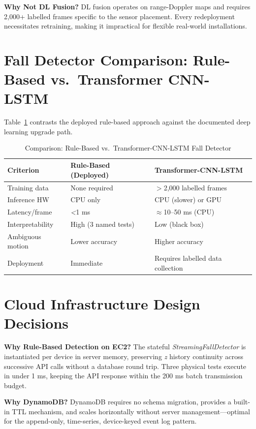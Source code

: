 \textbf{Why Not DL Fusion?} DL fusion operates on range-Doppler maps and requires 2,000+ labelled frames specific to the sensor placement. Every redeployment necessitates retraining, making it impractical for flexible real-world installations.

\section[Fall Detector Comparison]{Fall Detector Comparison: Rule-Based vs.~Transformer CNN-LSTM}

Table~\ref{tab:summary_8} contrasts the deployed rule-based approach against the documented deep learning upgrade path.

\begin{table}[H]
\caption{Comparison: Rule-Based vs.\ Transformer-CNN-LSTM Fall Detector}
\label{tab:summary_8}
\centering
\begin{tabularx}{\textwidth}{@{} l X X @{}}
\toprule
\textbf{Criterion} & \textbf{Rule-Based (Deployed)} & \textbf{Transformer-CNN-LSTM} \\ \midrule
Training data & None required & $>$2,000 labelled frames \\
Inference HW & CPU only & CPU (slower) or GPU \\
Latency/frame & \textit{<}1 ms & \textit{$\approx$}10--50 ms (CPU) \\
Interpretability & High (3 named tests) & Low (black box) \\
Ambiguous motion & Lower accuracy & Higher accuracy \\
Deployment & Immediate & Requires labelled data collection \\ \bottomrule
\end{tabularx}
\end{table}




\section{Cloud Infrastructure Design Decisions}

\textbf{Why Rule-Based Detection on EC2?} The stateful \textit{StreamingFallDetector} is instantiated per device in server memory, preserving \textit{z} history continuity across successive API calls without a database round trip. Three physical tests execute in under 1 ms, keeping the API response within the 200 ms batch transmission budget.

\textbf{Why DynamoDB?} DynamoDB requires no schema migration, provides a built-in TTL mechanism, and scales horizontally without server management---optimal for the append-only, time-series, device-keyed event log pattern.

